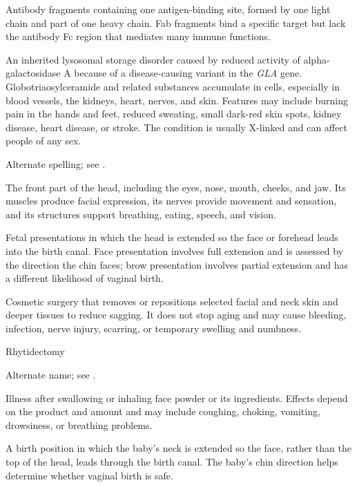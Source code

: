  Antibody fragments containing one antigen-binding site, formed by one light chain and part of one heavy chain. Fab fragments bind a specific target but lack the antibody Fc region that mediates many immune functions.

 An inherited lysosomal storage disorder caused by reduced activity of alpha-galactosidase A because of a disease-causing variant in the \textit{GLA} gene. Globotriaosylceramide and related substances accumulate in cells, especially in blood vessels, the kidneys, heart, nerves, and skin. Features may include burning pain in the hands and feet, reduced sweating, small dark-red skin spots, kidney disease, heart disease, or stroke. The condition is usually X-linked and can affect people of any sex.

 Alternate spelling; see .

 The front part of the head, including the eyes, nose, mouth, cheeks, and jaw. Its muscles produce facial expression, its nerves provide movement and sensation, and its structures support breathing, eating, speech, and vision.

 Fetal presentations in which the head is extended so the face or forehead leads into the birth canal. Face presentation involves full extension and is assessed by the direction the chin faces; brow presentation involves partial extension and has a different likelihood of vaginal birth.

 Cosmetic surgery that removes or repositions selected facial and neck skin and deeper tissues to reduce sagging. It does not stop aging and may cause bleeding, infection, nerve injury, scarring, or temporary swelling and numbness.

\synonyms
Rhytidectomy

 Alternate name; see .

 Illness after swallowing or inhaling face powder or its ingredients. Effects depend on the product and amount and may include coughing, choking, vomiting, drowsiness, or breathing problems.

 A birth position in which the baby’s neck is extended so the face, rather than the top of the head, leads through the birth canal. The baby’s chin direction helps determine whether vaginal birth is safe.

